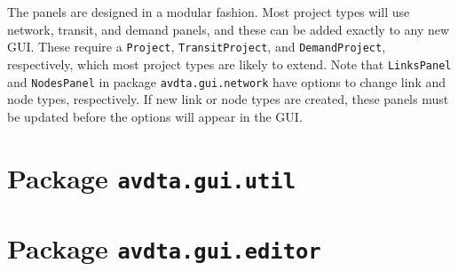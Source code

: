 The panels are designed in a modular fashion. Most project types will use network, transit, and demand panels, and these can be added exactly to any new GUI. These require a \texttt{Project}, \texttt{TransitProject}, and \texttt{DemandProject}, respectively, which most project types are likely to extend. Note that \texttt{LinksPanel} and \texttt{NodesPanel} in package \texttt{avdta.gui.network} have options to change link and node types, respectively. If new link or node types are created, these panels must be updated before the options will appear in the GUI.












\section{Package \texttt{avdta.gui.util}}
\label{api:util}



\section{Package \texttt{avdta.gui.editor}}